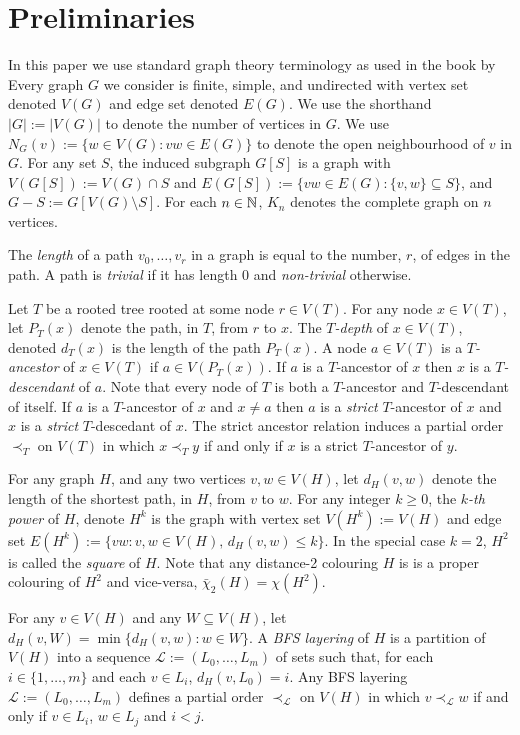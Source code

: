 \documentclass[kpfonts]{patmorin}
\newcommand{\dtcn}{\bar{\chi}_2}
\theoremstyle{named}
\begin{document}
\section{Preliminaries}

In this paper we use standard graph theory terminology as used in the book by \citet{diestel:graph}
Every graph $G$ we consider is finite, simple, and undirected with vertex set denoted $V(G)$ and edge set denoted $E(G)$.  We use the shorthand $|G|:=|V(G)|$ to denote the number of vertices in $G$.  We use $N_G(v):=\{w\in V(G): vw\in E(G)\}$ to denote the open neighbourhood of $v$ in $G$.  For any set $S$, the induced subgraph  $G[S]$ is a graph with $V(G[S]):=V(G)\cap S$ and $E(G[S]):=\{vw\in E(G): \{v,w\}\subseteq S\}$, and $G-S:=G[V(G)\setminus S]$. For each $n\in\mathbb{N}$, $K_n$ denotes the complete graph on $n$ vertices.

The \emph{length} of a path $v_0,\ldots,v_r$ in a graph is equal to the number, $r$, of edges in the path. A path is \emph{trivial} if it has length 0 and \emph{non-trivial} otherwise.

Let $T$ be a rooted tree rooted at some node $r\in V(T)$.  For any node $x\in V(T)$, let $P_T(x)$ denote the path, in $T$, from $r$ to $x$.  The \emph{$T$-depth} of $x\in V(T)$, denoted $d_T(x)$ is the length of the path $P_T(x)$.  A node $a\in V(T)$ is a \emph{$T$-ancestor} of $x\in V(T)$ if $a\in V(P_T(x))$. If $a$ is a $T$-ancestor of $x$ then $x$ is a \emph{$T$-descendant} of $a$.  Note that every node of $T$ is both a $T$-ancestor and $T$-descendant of itself.  If $a$ is a $T$-ancestor of $x$ and $x\neq a$ then $a$ is a \emph{strict} $T$-ancestor of $x$ and $x$ is a \emph{strict} $T$-descedant of $x$.  The strict ancestor relation induces a partial order $\prec_T$ on $V(T)$ in which $x\prec_T y$ if and only if $x$ is a strict $T$-ancestor of $y$.

For any graph $H$, and any two vertices $v,w\in V(H)$, let $d_H(v,w)$ denote the length of the shortest path, in $H$, from $v$ to $w$. For any integer $k\ge 0$, the \emph{$k$-th power} of $H$, denote $H^k$ is the graph with vertex set $V(H^k):=V(H)$ and edge set $E(H^{k}):=\{vw:v,w\in V(H),\,d_H(v,w)\le k\}$. In the special case $k=2$, $H^2$ is called the \emph{square} of $H$.  Note that any distance-2 colouring $H$ is is a proper colouring of $H^2$ and vice-versa, $\dtcn(H)=\chi(H^2)$.

For any $v\in V(H)$ and any $W\subseteq V(H)$, let $d_H(v,W)=\min\{d_H(v,w):w\in W\}$. A \emph{BFS layering} of $H$ is a partition of $V(H)$ into a sequence $\mathcal{L}:=(L_0,\ldots,L_m)$ of sets such that, for each $i\in\{1,\ldots,m\}$ and each $v\in L_i$, $d_H(v,L_0)=i$.  Any BFS layering $\mathcal{L}:=(L_0,\ldots,L_m)$ defines a partial order $\prec_{\mathcal{L}}$ on $V(H)$ in which $v\prec_{\mathcal{L}} w$ if and only if $v\in L_i$, $w\in L_j$ and $i<j$.
\end{document}
